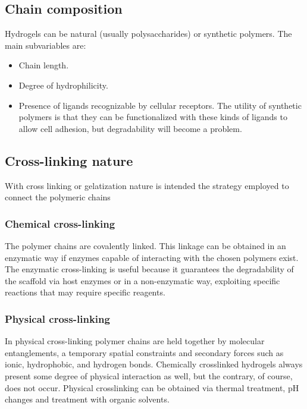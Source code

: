 	\subsection{Chain composition}
	Hydrogels can be natural (usually polysaccharides) or synthetic polymers.
	The main subvariables are:

	\begin{multicols}{2}
		\begin{itemize}
			\item Chain length.
			\item Degree of hydrophilicity.
			\item Presence of ligands recognizable by cellular receptors.
				The utility of synthetic polymers is that they can be functionalized with these kinds of ligands to allow cell adhesion, but degradability will become a problem.
		\end{itemize}
	\end{multicols}

	\subsection{Cross-linking nature}
	With cross linking or gelatization nature is intended the strategy employed to connect the polymeric chains

		\subsubsection{Chemical cross-linking}
		The polymer chains are covalently linked.
		This linkage can be obtained in an enzymatic way if enzymes capable of interacting with the chosen polymers exist.
		The enzymatic cross-linking is useful because it guarantees the degradability of the scaffold via host enzymes or in a non-enzymatic way, exploiting specific reactions that may require specific reagents.

		\subsubsection{Physical cross-linking}
		In physical cross-linking polymer chains are held together by molecular entanglements, a temporary spatial constraints and secondary forces such as ionic, hydrophobic, and hydrogen bonds.
		Chemically crosslinked hydrogels always present some degree of physical interaction as well, but the contrary, of course, does not occur.
		Physical crosslinking can be obtained via thermal treatment, pH changes and treatment with organic solvents.

